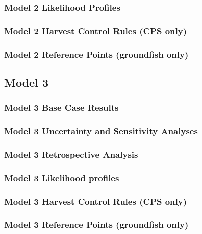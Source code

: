 \documentclass[12pt,]{article}
\begin{document}
\subsubsection{Model 2 Likelihood
Profiles}\label{model-2-likelihood-profiles}

\subsubsection{Model 2 Harvest Control Rules (CPS
only)}\label{model-2-harvest-control-rules-cps-only}

\subsubsection{Model 2 Reference Points (groundfish
only)}\label{model-2-reference-points-groundfish-only}

\subsection{Model 3}\label{model-3}

\subsubsection{Model 3 Base Case
Results}\label{model-3-base-case-results}

\subsubsection{Model 3 Uncertainty and Sensitivity
Analyses}\label{model-3-uncertainty-and-sensitivity-analyses}

\subsubsection{Model 3 Retrospective
Analysis}\label{model-3-retrospective-analysis}

\subsubsection{Model 3 Likelihood
profiles}\label{model-3-likelihood-profiles}

\subsubsection{Model 3 Harvest Control Rules (CPS
only)}\label{model-3-harvest-control-rules-cps-only}

\subsubsection{Model 3 Reference Points (groundfish
only)}\label{model-3-reference-points-groundfish-only}
\end{document}
